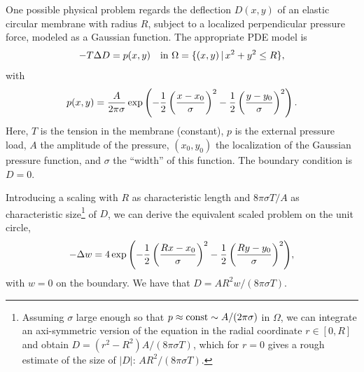 One possible physical problem regards the deflection
$D(x,y)$ of an elastic circular membrane
with radius $R$, subject to a localized perpendicular pressure
force, modeled as a Gaussian function.
The appropriate PDE model is
\begin{equation}
-T\Delta D = p(x,y)\quad\hbox{in }\Omega = \{ (x,y)\,|\, x^2+y^2\leq R\},
\end{equation}
with
\begin{equation}
p(x,y) = {A\over 2\pi\sigma}\exp{\left(
- {1\over2}\left( {x-x_0\over\sigma}\right)^2
- {1\over2}\left( {y-y_0\over\sigma}\right)^2
\right)}\, . 
\end{equation}
Here, $T$ is the tension in the membrane (constant), $p$ is the external
pressure load,
$A$ the amplitude of the pressure, $(x_0,y_0)$ the localization of
the Gaussian pressure function, and $\sigma$ the ``width'' of this
function. The boundary condition is $D=0$.

Introducing a scaling with $R$ as characteristic length and
$8\pi\sigma T/A$ as characteristic size\footnote{
Assuming $\sigma$ large enough so that 
$p\approx\hbox{const} \sim A/(2\pi\sigma)$ 
in $\Omega$, we can integrate an axi-symmetric version of the 
equation in the radial coordinate $r\in [0,R]$
and obtain $D=(r^2-R^2)A/(8\pi\sigma T)$,
which for $r=0$ gives a rough estimate of the size of $|D|$: 
$AR^2/(8\pi\sigma T)$.}
 of $D$, we can derive the equivalent
scaled problem on the unit circle,
\begin{equation}
\label{langtangen:poisson1:membrane:scaled:eq}
-\Delta w = 
4\exp{\left(
- {1\over2}\left( {Rx-x_0\over\sigma}\right)^2
- {1\over2}\left( {Ry-y_0\over\sigma}\right)^2
\right)},
\end{equation}
with $w=0$ on the boundary. We have that $D = AR^2w/(8\pi\sigma T)$.

